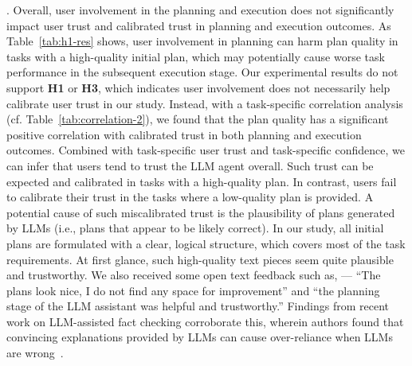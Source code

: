 . 
Overall, user involvement in the planning and execution does not significantly impact user trust and calibrated trust in planning and execution outcomes. 
As Table~\ref{tab:h1-res} shows, user involvement in planning can harm plan quality in tasks with a high-quality initial plan, which may potentially cause worse task performance in the subsequent execution stage. 
Our experimental results do not support \textbf{H1} or \textbf{H3}, which indicates user involvement does not necessarily help calibrate user trust in our study. 
Instead, with a task-specific correlation analysis (cf. Table~\ref{tab:correlation-2}), we found that the plan quality has a significant positive correlation with calibrated trust in both planning and execution outcomes. 
Combined with task-specific user trust and task-specific confidence, we can infer that users tend to trust the LLM agent overall. 
Such trust can be expected and calibrated in tasks with a high-quality plan. 
In contrast, users fail to calibrate their trust in the tasks where a low-quality plan is provided. {A potential cause of such miscalibrated trust is the plausibility of plans generated by LLMs (i.e., plans that appear to be likely correct).} 
In our study, all initial plans are formulated with a clear, logical structure, which covers most of the task requirements. 
At first glance, such high-quality text pieces seem quite plausible and trustworthy. 
We also received some open text feedback such as, --- ``The plans look nice, I do not find any space for improvement'' and ``the planning stage of the LLM assistant was helpful and trustworthy.'' 
Findings from recent work on LLM-assisted fact checking corroborate this, wherein authors found that convincing explanations provided by LLMs can cause over-reliance when LLMs are wrong~\cite{si2024large}.

